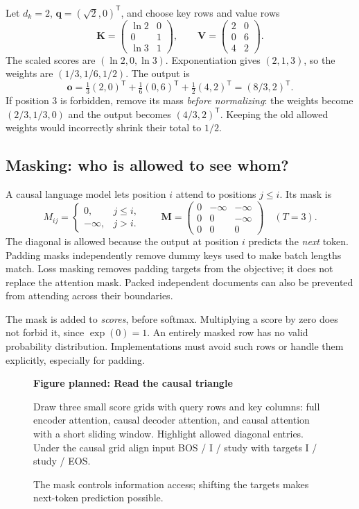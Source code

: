 \documentclass[11pt, oneside]{book}
\newcommand{\T}{^{\mathsf{T}}}           %
\let\originalsubsection\subsection
\renewcommand{\subsection}{\Needspace{6\baselineskip}\originalsubsection}
\newcommand{\figureplaceholder}[5]{%
\begin{figure}[htbp]
\centering
\begin{tcolorbox}[unbreakable,width=\linewidth,height=#1,colback=accent!3,
  colframe=accent!30,boxrule=0.5pt,arc=2.5mm,sharp corners=all,
  valign=center,halign=center,fontupper=\small]
{\bfseries\color{accent}Figure planned: #2}\par\medskip
{\color{gray!75!black}#3}
\end{tcolorbox}
\caption{#4}\label{#5}
\end{figure}}
\begin{document}
\begin{exbox}[title={A complete lookup with two features}]
Let $d_k=2$, $\mathbf{q}=(\sqrt2,0)\T$, and choose key rows and value rows
\[
 \mathbf{K}=\begin{pmatrix}\ln2&0\\0&1\\\ln3&1\end{pmatrix},
 \qquad \mathbf{V}=\begin{pmatrix}2&0\\0&6\\4&2\end{pmatrix}.
\]
The scaled scores are $(\ln2,0,\ln3)$. Exponentiation gives $(2,1,3)$, so the weights are $(1/3,1/6,1/2)$. The output is
\[
 \mathbf{o}=\tfrac13(2,0)\T+\tfrac16(0,6)\T+\tfrac12(4,2)\T=(8/3,2)\T.
\]
If position 3 is forbidden, remove its mass \emph{before normalizing}: the weights become $(2/3,1/3,0)$ and the output becomes $(4/3,2)\T$. Keeping the old allowed weights would incorrectly shrink their total to $1/2$.
\end{exbox}

\subsection*{Masking: who is allowed to see whom?}
A causal language model lets position $i$ attend to positions $j\leq i$. Its mask is
\[
 M_{ij}=\begin{cases}0,&j\leq i,\\-\infty,&j>i.\end{cases}
 \qquad
 \mathbf{M}=\begin{pmatrix}
 0&-\infty&-\infty\\0&0&-\infty\\0&0&0
 \end{pmatrix}\quad(T=3).
\]
The diagonal is allowed because the output at position $i$ predicts the \emph{next} token. Padding masks independently remove dummy keys used to make batch lengths match. Loss masking removes padding targets from the objective; it does not replace the attention mask. Packed independent documents can also be prevented from attending across their boundaries.

The mask is added to \emph{scores}, before softmax. Multiplying a score by zero does not forbid it, since $\exp(0)=1$. An entirely masked row has no valid probability distribution. Implementations must avoid such rows or handle them explicitly, especially for padding.

\figureplaceholder{3.8cm}{Read the causal triangle}{Draw three small score grids with query rows and key columns: full encoder attention, causal decoder attention, and causal attention with a short sliding window. Highlight allowed diagonal entries. Under the causal grid align input BOS / I / study with targets I / study / EOS.}{The mask controls information access; shifting the targets makes next-token prediction possible.}{fig:transformer-masks}
\end{document}
